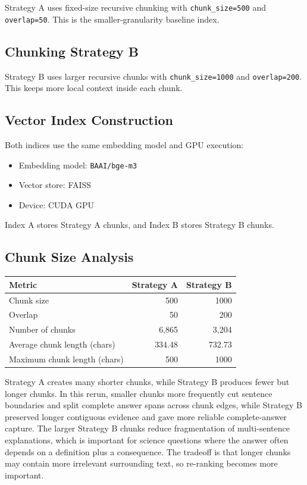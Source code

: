 \documentclass[12pt,a4paper]{article}
\begin{document}
Strategy A uses fixed-size recursive chunking with \texttt{chunk\_size=500} and \texttt{overlap=50}. This is the smaller-granularity baseline index.

\subsection{Chunking Strategy B}

Strategy B uses larger recursive chunks with \texttt{chunk\_size=1000} and \texttt{overlap=200}. This keeps more local context inside each chunk.

\subsection{Vector Index Construction}

Both indices use the same embedding model and GPU execution:

\begin{itemize}
    \item Embedding model: \texttt{BAAI/bge-m3}
    \item Vector store: FAISS
    \item Device: CUDA GPU
\end{itemize}

Index A stores Strategy A chunks, and Index B stores Strategy B chunks.

\subsection{Chunk Size Analysis}

\begin{table}[H]
\centering
\begin{tabular}{lrr}
\toprule
\textbf{Metric} & \textbf{Strategy A} & \textbf{Strategy B} \\
\midrule
Chunk size & 500 & 1000 \\
Overlap & 50 & 200 \\
Number of chunks & 6,865 & 3,204 \\
Average chunk length (chars) & 334.48 & 732.73 \\
Maximum chunk length (chars) & 500 & 1000 \\
\bottomrule
\end{tabular}
\end{table}

Strategy A creates many shorter chunks, while Strategy B produces fewer but longer chunks. In this rerun, smaller chunks more frequently cut sentence boundaries and split complete answer spans across chunk edges, while Strategy B preserved longer contiguous evidence and gave more reliable complete-answer capture.
The larger Strategy B chunks reduce fragmentation of multi-sentence explanations, which is important for science questions where the answer often depends on a definition plus a consequence. The tradeoff is that longer chunks may contain more irrelevant surrounding text, so re-ranking becomes more important.
\end{document}
